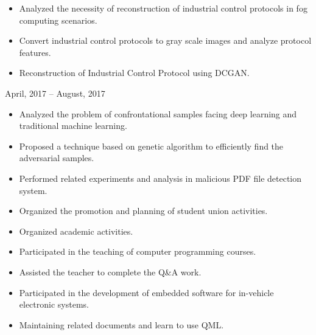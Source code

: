 ﻿\documentclass{resume_en}
\begin{document}
\begin{itemize}
	\item Analyzed the necessity of reconstruction of industrial control protocols in fog computing scenarios.
	\item Convert industrial control protocols to gray scale images and analyze protocol features.
	\item Reconstruction of Industrial Control Protocol using DCGAN.
\end{itemize}

 {April, 2017 -- August, 2017}
\begin{itemize}
	\item Analyzed the problem of confrontational samples facing deep learning and traditional machine learning.
	\item Proposed a technique based on genetic algorithm to efficiently find the adversarial samples.
    \item Performed related experiments and analysis in malicious PDF file detection system.
\end{itemize}

\StudentTeams
{}
\begin{itemize}
	\item Organized the promotion and planning of student union activities.
	\item Organized academic activities.
\end{itemize}

\begin{itemize}
    \item Participated in the teaching of computer programming courses.
    \item Assisted the teacher to complete the Q\&A work.
\end{itemize}

\OtherWorkExperience

\begin{itemize}
	\item Participated in the development of embedded software for in-vehicle electronic systems.
	\item Maintaining related documents and learn to use QML.
\end{itemize}
\end{document}
